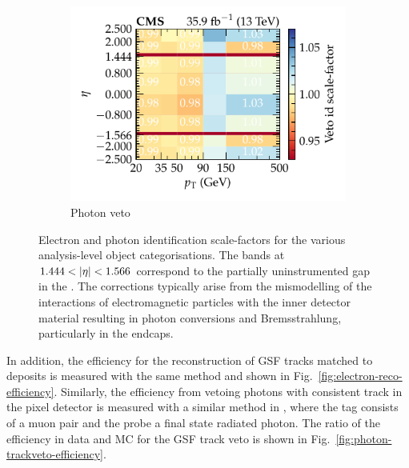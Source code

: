 \begin{figure}[htb]
\begin{subfigure}[b]{0.49\textwidth}
        \centering
        \includegraphics{chapters/041_corrections/images/efficiencies/objects/photons/photon_id_veto_sf.pdf}
        \caption{Photon veto}
        \label{subfigc:egamma-id-iso-efficiency}
    \end{subfigure}
    \caption[Corrections to simulated electron and photon identification efficiencies.]{
        Electron and photon identification scale-factors for the various analysis-level object categorisations. The bands at ${1.444<\aeta<1.566}$ correspond to the partially uninstrumented gap in the \ECAL. The corrections typically arise from the mismodelling of the interactions of electromagnetic particles with the inner detector material resulting in photon conversions and Bremsstrahlung, particularly in the endcaps. 
    }
    \label{fig:egamma-id-iso-efficiency}
\end{figure}

In addition, the efficiency for the reconstruction of GSF tracks matched to \ECAL deposits is measured with the same method and shown in Fig.~\ref{fig:electron-reco-efficiency}. Similarly, the efficiency from vetoing photons with consistent track in the pixel detector is measured with a similar method in \IDYmmg, where the tag consists of a muon pair and the probe a final state radiated photon. The ratio of the efficiency in data and MC for the GSF track veto is shown in Fig.~\ref{fig:photon-trackveto-efficiency}.

